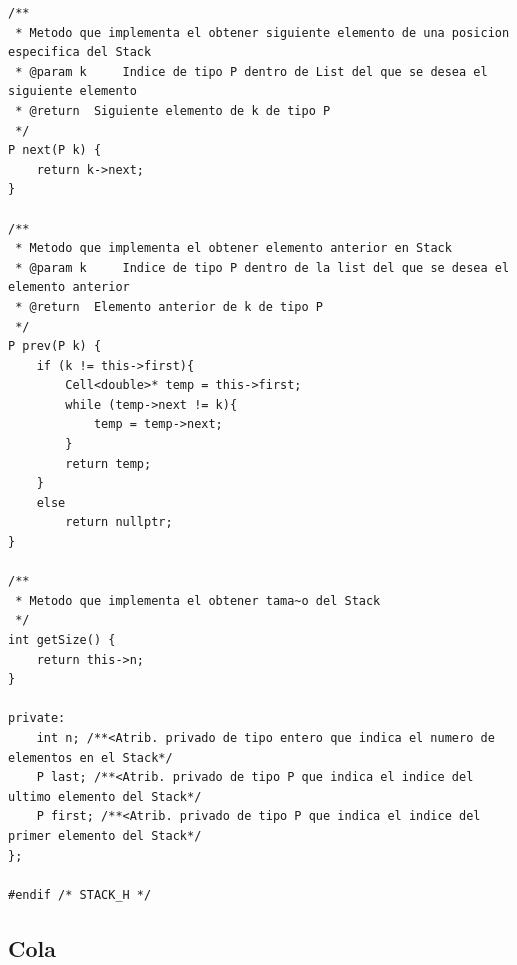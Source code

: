 \documentclass[11pt]{article}
\begin{document}
\begin{lstlisting}
/**
 * Metodo que implementa el obtener siguiente elemento de una posicion especifica del Stack
 * @param k 	Indice de tipo P dentro de List del que se desea el siguiente elemento 
 * @return 	Siguiente elemento de k de tipo P
 */
P next(P k) {
	return k->next;
}

/**
 * Metodo que implementa el obtener elemento anterior en Stack
 * @param k 	Indice de tipo P dentro de la list del que se desea el elemento anterior
 * @return 	Elemento anterior de k de tipo P
 */
P prev(P k) {
	if (k != this->first){
		Cell<double>* temp = this->first;
		while (temp->next != k){
			temp = temp->next;
		}
		return temp;
	}
	else
		return nullptr;
}

/**
 * Metodo que implementa el obtener tama~o del Stack
 */
int getSize() {
	return this->n;
}

private:
	int n; /**<Atrib. privado de tipo entero que indica el numero de elementos en el Stack*/
	P last; /**<Atrib. privado de tipo P que indica el indice del ultimo elemento del Stack*/
	P first; /**<Atrib. privado de tipo P que indica el indice del primer elemento del Stack*/
};

#endif /* STACK_H */
\end{lstlisting}
\newpage
\subsection{Cola}
\end{document}
